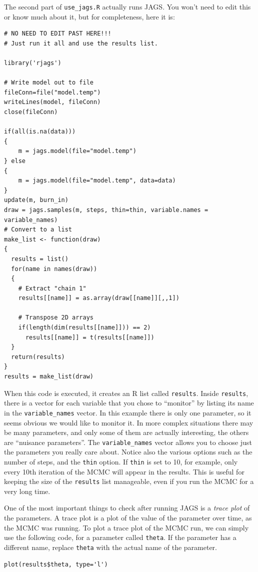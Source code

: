 The second part of {\tt use\_jags.R} actually runs JAGS. You won't need to edit
this or know much about it, but for completeness, here it is:

\begin{verbatim}
# NO NEED TO EDIT PAST HERE!!!
# Just run it all and use the results list.

library('rjags')

# Write model out to file
fileConn=file("model.temp")
writeLines(model, fileConn)
close(fileConn)

if(all(is.na(data)))
{
    m = jags.model(file="model.temp")
} else
{
    m = jags.model(file="model.temp", data=data)
}
update(m, burn_in)
draw = jags.samples(m, steps, thin=thin, variable.names = variable_names)
# Convert to a list
make_list <- function(draw)
{
  results = list()
  for(name in names(draw))
  {
    # Extract "chain 1"
    results[[name]] = as.array(draw[[name]][,,1])
    
    # Transpose 2D arrays
    if(length(dim(results[[name]])) == 2)
      results[[name]] = t(results[[name]])
  }
  return(results)
}
results = make_list(draw)
\end{verbatim}

When this code is executed, it creates an R list called {\tt results}.
Inside {\tt results}, there is a vector
for each variable that you chose to ``monitor'' by listing its name in
the {\tt variable\_names} vector. In this example there is only one parameter,
so it seems obvious we would like to monitor it. In more complex situations there
may be many parameters, and only some of them are actually interesting, the others
are ``nuisance parameters''. The {\tt variable\_names} vector allows you to choose
just the parameters you really care about.
Notice also the various options such as the number of steps, and the {\tt thin}
option. If {\tt thin} is set to 10, for example, only every 10th iteration
of the MCMC will appear in the results. This is useful for keeping the size
of the {\tt results} list manageable, even if you run the MCMC for a very
long time.

One of the most important things to check after running JAGS is a {\it trace
plot} of the parameters. A trace plot is a plot of the value of the parameter
over time, as the MCMC was running.
To plot a trace plot of the MCMC run, we can simply use the following code,
for a parameter called {\tt theta}. If the parameter has a different name,
replace {\tt theta} with the actual name of the parameter.
\begin{verbatim}
plot(results$theta, type='l')
\end{verbatim}

